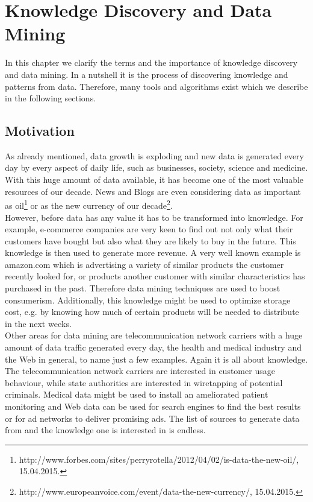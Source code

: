 \chapter{Knowledge Discovery and Data Mining}\label{chapter:kdd}
In this chapter we clarify the terms and the importance of knowledge discovery and data mining. In a nutshell it is the process of discovering knowledge and patterns from data. Therefore, many tools and algorithms exist which we describe in the following sections.
\section{Motivation}
As already mentioned, data growth is exploding and new data is generated every day by every aspect of daily life, such as businesses, society, science and medicine. With this huge amount of data available, it has become one of the most valuable resources of our decade. News and Blogs are even considering data as important as oil\footnote{http://www.forbes.com/sites/perryrotella/2012/04/02/is-data-the-new-oil/, 15.04.2015.} or as the new currency of our decade\footnote{http://www.europeanvoice.com/event/data-the-new-currency/, 15.04.2015.}. 
\\
However, before data has any value it has to be transformed into knowledge. For example, e-commerce companies are very keen to find out not only what their customers have bought but also what they are likely to buy in the future. This knowledge is then used to generate more revenue. A very well known example is amazon.com which is advertising a variety of similar products the customer recently looked for, or products another customer with similar characteristics has purchased in the past. Therefore data mining techniques are used to boost consumerism. Additionally, this knowledge might be used to optimize storage cost, e.g. by knowing how much of certain products will be needed to distribute in the next weeks.
\\
Other areas for data mining are telecommunication network carriers with a huge amount of data traffic generated every day, the health and medical industry and the Web in general, to name just a few examples. Again it is all about knowledge. The telecommunication network carriers are interested in customer usage behaviour, while state authorities are interested in wiretapping of potential criminals. Medical data might be used to install an ameliorated patient monitoring and Web data can be used for search engines to find the best results or for ad networks to deliver promising ads. The list of sources to generate data from and the knowledge one is interested in is endless.


